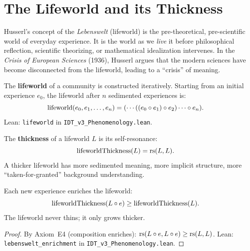 
\section{The Lifeworld and its Thickness}

Husserl's concept of the \textit{Lebenswelt} (lifeworld) is the pre-theoretical,
pre-scientific world of everyday experience.  It is the world as we \emph{live} it
before philosophical reflection, scientific theorizing, or mathematical
idealization intervenes.  In the \textit{Crisis of European Sciences} (1936),
Husserl argues that the modern sciences have become disconnected from the
lifeworld, leading to a ``crisis'' of meaning.

\begin{definition}[Lifeworld]
\label{def:lifeworld}
The \textbf{lifeworld} of a community is constructed iteratively.  Starting from
an initial experience $e_0$, the lifeworld after $n$ sedimented experiences is:
\[
\mathrm{lifeworld}(e_0, e_1, \ldots, e_n) = (\cdots((e_0 \circ e_1) \circ e_2) \cdots \circ e_n).
\]
Lean: \texttt{lifeworld} in \texttt{IDT\_v3\_Phenomenology.lean}.
\end{definition}

\begin{definition}
\label{def:lifeworld-thickness}
The \textbf{thickness} of a lifeworld $L$ is its self-resonance:
\[
\mathrm{lifeworldThickness}(L) = \mathrm{rs}(L, L).
\]
A thicker lifeworld has more sedimented meaning, more implicit structure,
more ``taken-for-granted'' background understanding.
\end{definition}

\begin{theorem}
\label{thm:lifeworld-enrichment}
Each new experience enriches the lifeworld:
\[
\mathrm{lifeworldThickness}(L \circ e) \geq \mathrm{lifeworldThickness}(L).
\]
The lifeworld never thins; it only grows thicker.
\end{theorem}

\begin{proof}
By Axiom~E4 (composition enriches):
$\mathrm{rs}(L \circ e, L \circ e) \geq \mathrm{rs}(L, L)$.
Lean: \texttt{lebenswelt\_enrichment} in \texttt{IDT\_v3\_Phenomenology.lean}.
\end{proof}


